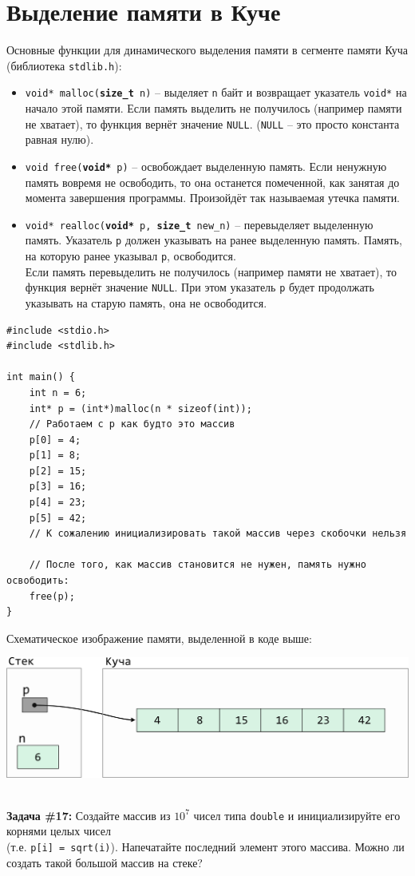 \documentclass{article}
\begin{document}
\section*{Выделение памяти в Куче}
Основные функции для динамического выделения памяти в сегменте памяти Куча (библиотека \texttt{stdlib.h}):
\begin{itemize}
\item \texttt{void* malloc(\textbf{size\_t} n)} -- выделяет \texttt{n} байт и возвращает указатель \texttt{void*}
на начало этой памяти. Если память выделить не получилось (например памяти не хватает), то функция вернёт значение \texttt{NULL}. (\texttt{NULL} -- это просто константа равная нулю). \\
\item \texttt{void free(\textbf{void*} p)} -- освобождает выделенную память. Если ненужную память вовремя не освободить, то она останется помеченной, как занятая до момента завершения программы. Произойдёт так называемая утечка памяти.\\
\item \texttt{void* realloc(\textbf{void*} p, \textbf{size\_t} new\_n)} -- перевыделяет выделенную память. Указатель \texttt{p} должен указывать на ранее выделенную память. Память, на которую ранее указывал \texttt{p}, освободится. \\
Если память перевыделить не получилось (например памяти не хватает), то функция вернёт значение \texttt{NULL}. При этом указатель \texttt{p} будет продолжать указывать на старую память, она не освободится.\\
\end{itemize}
\begin{lstlisting}
#include <stdio.h>
#include <stdlib.h>

int main() {
	int n = 6;
	int* p = (int*)malloc(n * sizeof(int)); 
	// Работаем с p как будто это массив
	p[0] = 4;
	p[1] = 8;
	p[2] = 15;
	p[3] = 16;
	p[4] = 23;
	p[5] = 42;
	// К сожалению инициализировать такой массив через скобочки нельзя
	
	// После того, как массив становится не нужен, память нужно освободить:
	free(p);
}
\end{lstlisting}
Схематическое изображение памяти, выделенной в коде выше:
\begin{center}
\includegraphics[scale=0.9]{../images/pointer_schemes/pointer_to_heap_array.png}
\end{center}
\quad\\
\textbf{Задача \#17:} Создайте массив из $10^7$ чисел типа \texttt{double} и инициализируйте его корнями
целых чисел\\ (т.е. \texttt{p[i] = sqrt(i)}). Напечатайте последний элемент этого массива. Можно ли 
создать такой большой массив на стеке?
\end{document}
